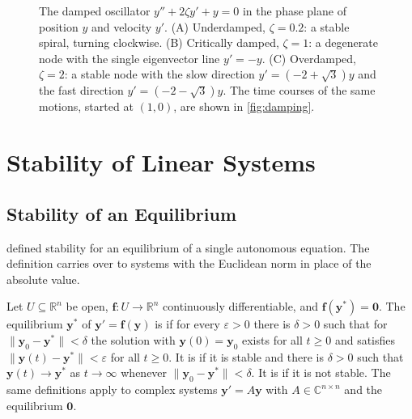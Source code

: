 \begin{figure}
{}
\caption{The damped oscillator $y''+2\zeta y'+y=0$ in the phase plane of position $y$ and velocity $y'$. (A) Underdamped, $\zeta=0.2$: a stable spiral, turning clockwise. (B) Critically damped, $\zeta=1$: a degenerate node with the single eigenvector line $y'=-y$. (C) Overdamped, $\zeta=2$: a stable node with the slow direction $y'=(-2+\sqrt3)y$ and the fast direction $y'=(-2-\sqrt3)y$. The time courses of the same motions, started at $(1,0)$, are shown in \cref{fig:damping}.\label{fig:damped-portraits}}
\end{figure}

\section{Stability of Linear Systems}
\label{sec:linear-stability}

\subsection{Stability of an Equilibrium}

 defined stability for an equilibrium of a single autonomous equation. The definition carries over to systems with the Euclidean norm in place of the absolute value.

\begin{definition}
\label{def:stability-systems}
Let $U\subseteq\mathbb R^n$ be open, $\mathbf f\colon U\to\mathbb R^n$ continuously differentiable, and $\mathbf f(\mathbf y^*)=\mathbf 0$. The equilibrium $\mathbf y^*$ of $\mathbf y'=\mathbf f(\mathbf y)$ is  if for every $\varepsilon>0$ there is $\delta>0$ such that for $\|\mathbf y_0-\mathbf y^*\|<\delta$ the solution with $\mathbf y(0)=\mathbf y_0$ exists for all $t\ge0$ and satisfies $\|\mathbf y(t)-\mathbf y^*\|<\varepsilon$ for all $t\ge0$. It is  if it is stable and there is $\delta>0$ such that $\mathbf y(t)\to\mathbf y^*$ as $t\to\infty$ whenever $\|\mathbf y_0-\mathbf y^*\|<\delta$. It is  if it is not stable. The same definitions apply to complex systems $\mathbf y'=A\mathbf y$ with $A\in\mathbb C^{n\times n}$ and the equilibrium $\mathbf 0$.
\end{definition}

